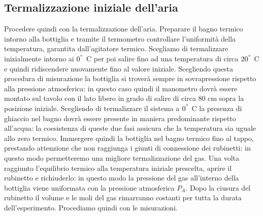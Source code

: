 \subsection{Termalizzazione iniziale dell'aria}
Procedere quindi con la termalizzazione dell'aria.
Preparare il bagno termico intorno alla bottiglia e tramite il termometro controllare l'uniformità della temperatura, garantita dall'agitatore termico.
Scegliamo di termalizzare inizialmente intorno ai $0^{\degree}$ C per poi salire fino ad una temperatura di circa $20^{\degree}$ C e quindi ridiscendere nuovamente fino al valore iniziale.
Scegliendo questa procedura di misurazione la bottiglia si troverà sempre in sovrapressione rispetto alla pressione atmosferica: in questo caso quindi il manometro dovrà essere montato sul tavolo con il lato libero in grado di salire di circa 80 cm sopra la posizione iniziale.
Scegliendo di termalizzare il sistema a $0^{\degree}$ C la presenza di ghiaccio nel bagno dovrà essere presente in maniera predominante rispetto all'acqua: la coesistenza di queste due fasi assicura che la temperatura sia uguale allo zero termico.
Immergere quindi la bottiglia nel bagno termico fino al tappo, prestando attenzione che non raggiunga i giunti di connessione dei rubinetti: in questo modo permetteremo una migliore termalizzazione del gas.
Una volta raggiunto l'equilibrio termico alla temperatura iniziale prescelta, aprire il rubinetto e richiuderlo: in questo modo la pressione del gas all'interno della bottiglia viene uniformata con la pressione atmosferica $P_{A}$.
Dopo la ciusura del rubinetto il volume e le moli del gas rimarranno costanti per tutta la durata dell'esperimento.
Procediamo quindi con le misurazioni.\\

